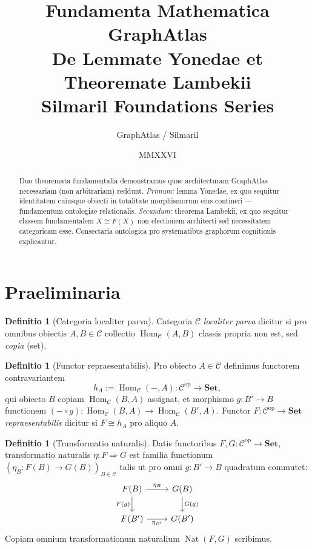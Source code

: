 \documentclass[11pt]{article}
\title{\color{silmaril}\textbf{Fundamenta Mathematica GraphAtlas}\\[0.5ex]
\large De Lemmate Yonedae et Theoremate Lambekii\\
\normalsize Silmaril Foundations Series}
\author{GraphAtlas / Silmaril}
\date{MMXXVI}
\theoremstyle{plain}
\theoremstyle{definition}
\newtheorem{definitio}[theorema]{Definitio}
\theoremstyle{remark}
\newcommand{\C}{\mathcal{C}}
\newcommand{\Set}{\mathbf{Set}}
\newcommand{\Hom}{\operatorname{Hom}}
\newcommand{\Nat}{\operatorname{Nat}}
\newcommand{\op}{\mathrm{op}}
\begin{document}
\maketitle

\begin{abstract}
\noindent Duo theoremata fundamentalia demonstramus quae architecturam GraphAtlas necessariam (non arbitrariam) reddunt. \emph{Primum:} lemma Yonedae, ex quo sequitur identitatem cuiusque obiecti in totalitate morphismorum eius contineri --- fundamentum ontologiae relationalis. \emph{Secundum:} theorema Lambekii, ex quo sequitur classem fundamentalem $X \cong F(X)$ non electionem architecti sed necessitatem categoricam esse. Consectaria ontologica pro systematibus graphorum cognitionis explicantur.
\end{abstract}

\tableofcontents

\section{Praeliminaria}

\begin{definitio}[Categoria localiter parva]
Categoria $\C$ \emph{localiter parva} dicitur si pro omnibus obiectis $A, B \in \C$ collectio $\Hom_\C(A,B)$ classis propria non est, sed \emph{copia} (set).
\end{definitio}

\begin{definitio}[Functor repraesentabilis]
Pro obiecto $A \in \C$ definimus functorem contravariantem
\[
h_A := \Hom_\C(-, A) \colon \C^{\op} \longrightarrow \Set,
\]
qui obiecto $B$ copiam $\Hom_\C(B,A)$ assignat, et morphismo $g\colon B' \to B$ functionem $(- \circ g)\colon \Hom_\C(B,A) \to \Hom_\C(B',A)$. Functor $F\colon \C^{\op} \to \Set$ \emph{repraesentabilis} dicitur si $F \cong h_A$ pro aliquo $A$.
\end{definitio}

\begin{definitio}[Transformatio naturalis]
Datis functoribus $F, G\colon \C^{\op} \to \Set$, transformatio naturalis $\eta\colon F \Rightarrow G$ est familia functionum $(\eta_B\colon F(B) \to G(B))_{B \in \C}$ talis ut pro omni $g\colon B' \to B$ quadratum commutet:
\[
\begin{tikzcd}
F(B) \arrow[r, "\eta_B"] \arrow[d, "F(g)"'] & G(B) \arrow[d, "G(g)"] \\
F(B') \arrow[r, "\eta_{B'}"'] & G(B')
\end{tikzcd}
\]
Copiam omnium transformationum naturalium $\Nat(F,G)$ scribimus.
\end{definitio}
\end{document}

